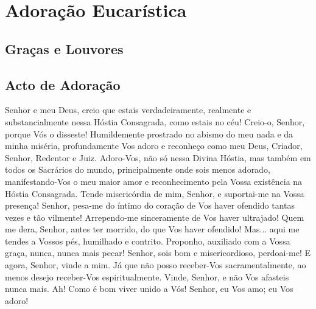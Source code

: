 \section{Adoração Eucarística}


\subsection{Graças e Louvores}
\begin{paracol}{2}\switchcolumn{}\switchcolumn*{}\switchcolumn{}\end{paracol}



\subsection{Acto de Adoração}

 Senhor e meu Deus, creio que estais verdadeiramente, realmente e substancialmente nessa Hóstia Consagrada, como estais no céu! Creio-o, Senhor, porque Vós o disseste! Humildemente prostrado no abismo do meu nada e da minha miséria, profundamente Vos adoro e reconheço como meu Deus, Criador, Senhor, Redentor e Juiz. Adoro-Vos, não só nessa Divina Hóstia, mas também em todos os Sacrários do mundo, principalmente onde sois menos adorado, manifestando-Vos o meu maior amor e reconhecimento pela Vossa existência na Hóstia Consagrada. Tende misericórdia de mim, Senhor, e suportai-me na Vossa presença! Senhor, pesa-me do íntimo do coração de Vos haver ofendido tantas vezes e tão vilmente! Arrependo-me sinceramente de Vos haver ultrajado! Quem me dera, Senhor, antes ter morrido, do que Vos haver ofendido! Mas... aqui me tendes a Vossos pés, humilhado e contrito. Proponho, auxiliado com a Vossa graça, nunca, nunca mais pecar! Senhor, sois bom e misericordioso, perdoai-me! E agora, Senhor, vinde a mim. Já que não posso receber-Vos sacramentalmente, ao menos desejo receber-Vos espiritualmente. Vinde, Senhor, e não Vos afasteis nunca mais. Ah! Como é bom viver unido a Vós! Senhor, eu Vos amo; eu Vos adoro!



\begin{paracol}{2}\switchcolumn{}\switchcolumn*{}\switchcolumn{}\end{paracol}

